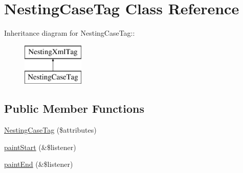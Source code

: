 \hypertarget{class_nesting_case_tag}{
\section{NestingCaseTag Class Reference}
\label{class_nesting_case_tag}
}
Inheritance diagram for NestingCaseTag::\begin{figure}[H]
\begin{center}
\leavevmode
\includegraphics[height=2cm]{class_nesting_case_tag}
\end{center}
\end{figure}
\subsection*{Public Member Functions}
\begin{DoxyCompactItemize}
\item 
\hyperlink{class_nesting_case_tag_a4e43ead868e70800531012f34e7b0f06}{NestingCaseTag} (\$attributes)
\item 
\hyperlink{class_nesting_case_tag_a4c7de3322b2b23964f43306fe4fbd52d}{paintStart} (\&\$listener)
\item 
\hyperlink{class_nesting_case_tag_af3517ffbfd868a92d4df6b0433f5a456}{paintEnd} (\&\$listener)
\end{DoxyCompactItemize}


